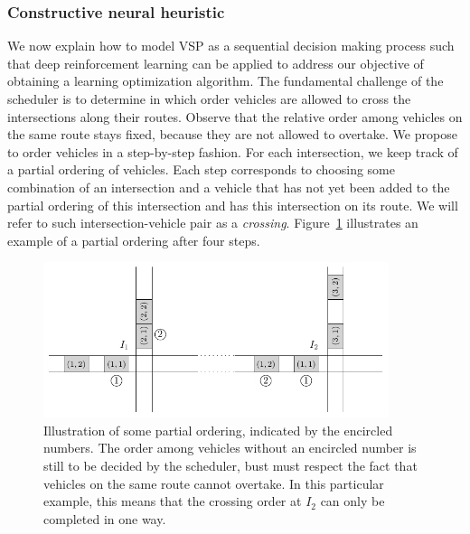 \documentclass[notitlepage]{report}
\begin{document}
\subsubsection*{Constructive neural heuristic}


We now explain how to model VSP as a sequential decision making process such
that deep reinforcement learning can be applied to address our objective of
obtaining a learning optimization algorithm.
The fundamental challenge of the scheduler is to determine in which order
vehicles are allowed to cross the intersections along their routes. Observe that
the relative order among vehicles on the same route stays fixed, because they
are not allowed to overtake.
%
We propose to order vehicles in a step-by-step fashion. For each intersection,
we keep track of a partial ordering of vehicles. Each step corresponds to
choosing some combination of an intersection and a vehicle that has not yet been
added to the partial ordering of this intersection and has this intersection on
its route. We will refer to such intersection-vehicle pair as a \textit{crossing}.
Figure~\ref{fig:network_ordering} illustrates an example of a partial ordering after four steps.

\begin{figure}[h]
  \centering
  \includegraphics[width=0.9\textwidth]{figures/network_ordering.pdf}
  \caption{Illustration of some partial ordering, indicated by the encircled
    numbers. The order among vehicles without an encircled number is still to be
    decided by the scheduler, bust must respect the fact that vehicles on the
    same route cannot overtake. In this particular example, this means that the
    crossing order at $I_{2}$ can only be completed in one way.}
  \label{fig:network_ordering}
\end{figure}
\end{document}
